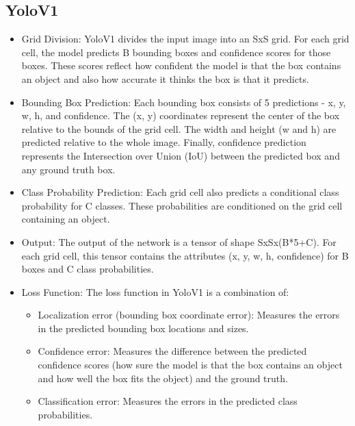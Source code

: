 \subsection{YoloV1}
\begin{itemize}
  \item Grid Division: YoloV1 divides the input image into an SxS grid. For each grid cell, the model predicts B bounding boxes and confidence scores for those boxes. These scores reflect how confident the model is that the box contains an object and also how accurate it thinks the box is that it predicts.
  \item Bounding Box Prediction: Each bounding box consists of 5 predictions - x, y, w, h, and confidence. The (x, y) coordinates represent the center of the box relative to the bounds of the grid cell. The width and height (w and h) are predicted relative to the whole image. Finally, confidence prediction represents the Intersection over Union (IoU) between the predicted box and any ground truth box.
  \item Class Probability Prediction: Each grid cell also predicts a conditional class probability for C classes. These probabilities are conditioned on the grid cell containing an object.
  \item Output: The output of the network is a tensor of shape SxSx(B*5+C). For each grid cell, this tensor contains the attributes (x, y, w, h, confidence) for B boxes and C class probabilities.
  \item Loss Function: The loss function in YoloV1 is a combination of:
        \begin{itemize}
          \item Localization error (bounding box coordinate error): Measures the errors in the predicted bounding box locations and sizes.
          \item Confidence error: Measures the difference between the predicted confidence scores (how sure the model is that the box contains an object and how well the box fits the object) and the ground truth.
          \item Classification error: Measures the errors in the predicted class probabilities.
        \end{itemize}
\end{itemize}

